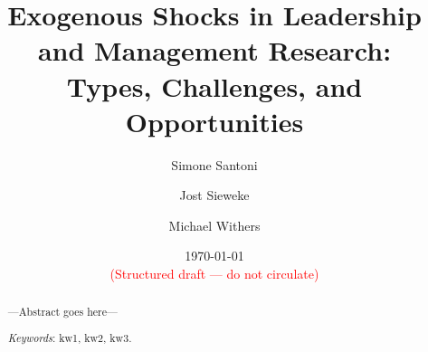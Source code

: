 \usepackage[toc, page]{appendix}





\title{Exogenous Shocks in Leadership and Management Research:\\
Types, Challenges, and Opportunities\vspace{2em}}

\author[$\bullet$]{Simone Santoni}
\author[$\star$]{Jost Sieweke}
\author[$\circ$]{Michael Withers}

\renewcommand\Authands{ and }
\renewcommand\Affilfont{\normalsize}

\date{\vspace{1em} \normalsize \today \vspace{1em} \\ 
      \textcolor{red}{(Structured draft --- do not circulate)}}



\begin{singlespace}

\maketitle

\begin{abstract}

---Abstract goes here---

\bigskip

\textit{Keywords}: kw1, kw2, kw3.

\end{abstract}

\end{singlespace}

